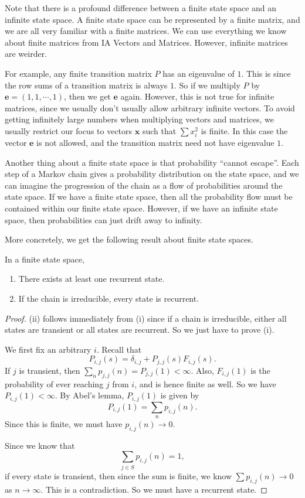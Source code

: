 \documentclass[a4paper]{article}
\begin{document}
Note that there is a profound difference between a finite state space and an infinite state space. A finite state space can be represented by a finite matrix, and we are all very familiar with a finite matrices. We can use everything we know about finite matrices from IA Vectors and Matrices. However, infinite matrices are weirder.

For example, any finite transition matrix $P$ has an eigenvalue of $1$. This is since the row sums of a transition matrix is always $1$. So if we multiply $P$ by $\mathbf{e} = (1, 1, \cdots, 1)$, then we get $\mathbf{e}$ again. However, this is not true for infinite matrices, since we usually don't usually allow arbitrary infinite vectors. To avoid getting infinitely large numbers when multiplying vectors and matrices, we usually restrict our focus to vectors $\mathbf{x}$ such that $\sum x_i^2$ is finite. In this case the vector $\mathbf{e}$ is not allowed, and the transition matrix need not have eigenvalue $1$.

Another thing about a finite state space is that probability ``cannot escape''. Each step of a Markov chain gives a probability distribution on the state space, and we can imagine the progression of the chain as a flow of probabilities around the state space. If we have a finite state space, then all the probability flow must be contained within our finite state space. However, if we have an infinite state space, then probabilities can just drift away to infinity.

More concretely, we get the following result about finite state spaces.
\begin{thm}
  In a finite state space,
  \begin{enumerate}
    \item There exists at least one recurrent state.
    \item If the chain is irreducible, every state is recurrent.
  \end{enumerate}
\end{thm}

\begin{proof}
  (ii) follows immediately from (i) since if a chain is irreducible, either all states are transient or all states are recurrent. So we just have to prove (i).

  We first fix an arbitrary $i$. Recall that
  \[
    P_{i, j}(s) = \delta_{i, j} + P_{j, j}(s) F_{i, j}(s).
  \]
  If $j$ is transient, then $\sum_n p_{j, j}(n) = P_{j, j}(1) < \infty$. Also, $F_{i, j}(1)$ is the probability of ever reaching $j$ from $i$, and is hence finite as well. So we have $P_{i, j}(1) < \infty$. By Abel's lemma, $P_{i, j}(1)$ is given by
  \[
    P_{i, j}(1) = \sum_n p_{i, j}(n).
  \]
  Since this is finite, we must have $p_{i, j}(n)\to 0$.

  Since we know that
  \[
    \sum_{j\in S}p_{i, j}(n) = 1,
  \]
  if every state is transient, then since the sum is finite, we know $\sum p_{i, j}(n) \to 0$ as $n\to \infty$. This is a contradiction. So we must have a recurrent state.
\end{proof}
\end{document}
